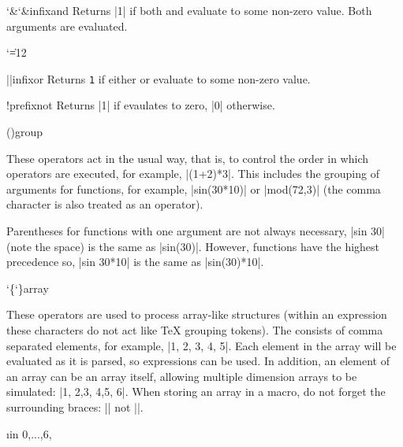 \begin{math-operator}{{\char`\&}{\char`\&}}{infix}{and}
  Returns |1| if both  and  evaluate to some
  non-zero value. Both arguments are evaluated.
\end{math-operator}



{
 \catcode`\|=12
\begin{math-operator}[no index]{||}{infix}{or}
  Returns {\tt 1} if either  or  evaluate to some
  non-zero value.
\end{math-operator}
}

\begin{math-operator}{!}{prefix}{not}
  Returns |1| if  evaulates to zero, |0| otherwise.
\end{math-operator}


\begin{math-operators}{(}{)}{group}{}

These operators act in the usual way, that is, to control the order 
in which operators are executed, for example, |(1+2)*3|. This
includes the grouping of arguments for functions, for example,
|sin(30*10)| or |mod(72,3)| (the comma character is also treated
as an operator).

Parentheses for functions with one argument are not always 
necessary, |sin 30| (note the space) is the same as |sin(30)|. 
However, functions have the highest precedence so, |sin 30*10| 
is the same as |sin(30)*10|.

\end{math-operators}


\begin{math-operators}{\char`\{}{\char`\}}{array}{}

These operators are used to process array-like structures (within an 
expression these characters do not act like \TeX{} grouping tokens). 
The  consists of comma separated elements,
for example, |{1, 2, 3, 4, 5}|. Each element in the array will be 
evaluated as it is parsed, so expressions can be used.
In addition, an element of an array can be an array itself, 
allowing multiple dimension arrays to be simulated: 
|{1, {2,3}, {4,5}, 6}|. 
When storing an array in a macro, do not forget the surrounding 
braces: |\def\myarray{{1,2,3}}| not |\def\myarray{1,2,3}|.

\begin{codeexample}[]
\def\myarray{{1,"two",2+1,"IV","cinq","sechs",sin(\i*5)*14}}
\foreach \i in  {0,...,6}{\pgfmathparse{\myarray[\i]}\pgfmathresult, }
\end{codeexample}

\end{math-operators}


